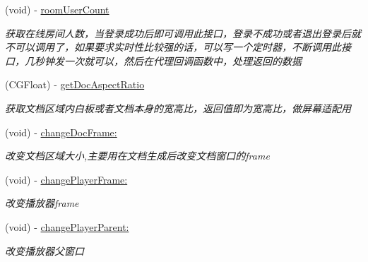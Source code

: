 \begin{DoxyCompactItemize}
\mbox{\label{interface_request_data_a626619664a5b87e0283f2c4f4b6231cb}} 
(void) -\/ \hyperlink{interface_request_data_a626619664a5b87e0283f2c4f4b6231cb}{room\+User\+Count}
\begin{DoxyCompactList}\small\item\em 获取在线房间人数，当登录成功后即可调用此接口，登录不成功或者退出登录后就不可以调用了，如果要求实时性比较强的话，可以写一个定时器，不断调用此接口，几秒钟发一次就可以，然后在代理回调函数中，处理返回的数据 \end{DoxyCompactList}\item 
\mbox{\label{interface_request_data_a2557f6728b0797aa4021a48ea0b21252}} 
(C\+G\+Float) -\/ \hyperlink{interface_request_data_a2557f6728b0797aa4021a48ea0b21252}{get\+Doc\+Aspect\+Ratio}
\begin{DoxyCompactList}\small\item\em 获取文档区域内白板或者文档本身的宽高比，返回值即为宽高比，做屏幕适配用 \end{DoxyCompactList}\item 
\mbox{\label{interface_request_data_a6bd441ac80191c90f9283709da9895c1}} 
(void) -\/ \hyperlink{interface_request_data_a6bd441ac80191c90f9283709da9895c1}{change\+Doc\+Frame\+:}
\begin{DoxyCompactList}\small\item\em 改变文档区域大小,主要用在文档生成后改变文档窗口的frame \end{DoxyCompactList}\item 
\mbox{\label{interface_request_data_a7d242ff8ab02b40741f8e1a75d785ec7}} 
(void) -\/ \hyperlink{interface_request_data_a7d242ff8ab02b40741f8e1a75d785ec7}{change\+Player\+Frame\+:}
\begin{DoxyCompactList}\small\item\em 改变播放器frame \end{DoxyCompactList}\item 
\mbox{\label{interface_request_data_aab62970b8d882746572a97f32992a5ae}} 
(void) -\/ \hyperlink{interface_request_data_aab62970b8d882746572a97f32992a5ae}{change\+Player\+Parent\+:}
\begin{DoxyCompactList}\small\item\em 改变播放器父窗口 \end{DoxyCompactList}\item 

\end{DoxyCompactItemize}
